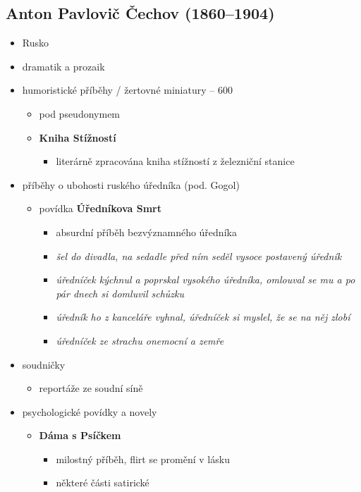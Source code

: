 \subsection{Anton Pavlovič Čechov (1860--1904)}
\begin{itemize}
\item Rusko
\item dramatik a prozaik
\item humoristické příběhy / žertovné miniatury -- 600
	\begin{itemize}
	\item pod pseudonymem
	\item \textbf{Kniha Stížností}
		\begin{itemize}
		\item literárně zpracována kniha stížností z železniční stanice
		\end{itemize}	
	\end{itemize}
\item příběhy o ubohosti ruského úředníka (pod. Gogol)
	\begin{itemize}
	\item povídka \textbf{Úředníkova Smrt}
		\begin{itemize}
		\item absurdní příběh bezvýznamného úředníka
		\item \textit{šel do divadla, na sedadle před ním seděl vysoce postavený úředník}
		\item \textit{úředníček kýchnul a poprskal vysokého úředníka, omlouval se mu a po pár dnech si domluvil schůzku}
		\item \textit{úředník ho z kanceláře vyhnal, úředníček si myslel, že se na něj zlobí}
		\item \textit{úředníček ze strachu onemocní a zemře}
		\end{itemize}
	\end{itemize}
\item soudničky
	\begin{itemize}
	\item reportáže ze soudní síně
	\end{itemize}
\item psychologické povídky a novely
	\begin{itemize}
	\item \textbf{Dáma s Psíčkem}
		\begin{itemize}
		\item milostný příběh, flirt se promění v lásku
		\item některé části satirické
		\end{itemize}

\end{itemize}
\end{itemize}
